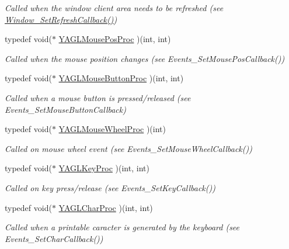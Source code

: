 \begin{DoxyCompactItemize}
\begin{DoxyCompactList}\small\item\em Called when the window client area needs to be refreshed (see \hyperlink{group____window_ga82ef727470b71f298b88ffbcd68a3a59}{Window\-\_\-\-Set\-Refresh\-Callback()}) \end{DoxyCompactList}\item 
typedef void($\ast$ \hyperlink{group____callbacks_ga2eaebac73cb5723a5e6be9684f31e2d4}{Y\-A\-G\-L\-Mouse\-Pos\-Proc} )(int, int)
\begin{DoxyCompactList}\small\item\em Called when the mouse position changes (see Events\-\_\-\-Set\-Mouse\-Pos\-Callback()) \end{DoxyCompactList}\item 
typedef void($\ast$ \hyperlink{group____callbacks_gaf531b934879174034c6a8e8c445c1796}{Y\-A\-G\-L\-Mouse\-Button\-Proc} )(int, int)
\begin{DoxyCompactList}\small\item\em Called when a mouse button is pressed/released (see Events\-\_\-\-Set\-Mouse\-Button\-Callback) \end{DoxyCompactList}\item 
typedef void($\ast$ \hyperlink{group____callbacks_gaf21030ff9e69d35f2fb63c7237a05236}{Y\-A\-G\-L\-Mouse\-Wheel\-Proc} )(int)
\begin{DoxyCompactList}\small\item\em Called on mouse wheel event (see Events\-\_\-\-Set\-Mouse\-Wheel\-Callback()) \end{DoxyCompactList}\item 
typedef void($\ast$ \hyperlink{group____callbacks_ga371415241d130ad515c79678d641c023}{Y\-A\-G\-L\-Key\-Proc} )(int, int)
\begin{DoxyCompactList}\small\item\em Called on key press/release (see Events\-\_\-\-Set\-Key\-Callback()) \end{DoxyCompactList}\item 
typedef void($\ast$ \hyperlink{group____callbacks_gaa6c80728cc25248bc13e6832e0cbef40}{Y\-A\-G\-L\-Char\-Proc} )(int, int)
\begin{DoxyCompactList}\small\item\em Called when a printable caracter is generated by the keyboard (see Events\-\_\-\-Set\-Char\-Callback()) \end{DoxyCompactList}\end{DoxyCompactItemize}


